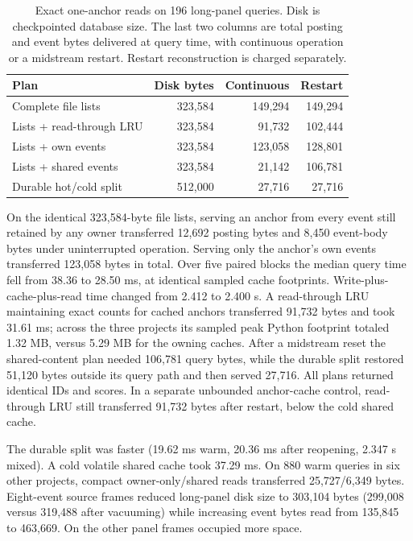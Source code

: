 \documentclass[conference]{IEEEtran}
\begin{document}
\begin{table}[t]
\caption{Exact one-anchor reads on 196 long-panel queries. Disk is checkpointed database size. The last two columns are total posting and event bytes delivered at query time, with continuous operation or a midstream restart. Restart reconstruction is charged separately.}
\label{tab:storage}\centering\small
\setlength{\tabcolsep}{4pt}
\begin{tabular}{@{}lrrr@{}}\toprule
Plan & Disk bytes & Continuous & Restart \\\midrule
Complete file lists & 323,584 & 149,294 & 149,294\\
Lists + read-through LRU & 323,584 & 91,732 & 102,444\\
Lists + own events & 323,584 & 123,058 & 128,801\\
Lists + shared events & 323,584 & 21,142 & 106,781\\
Durable hot/cold split & 512,000 & 27,716 & 27,716\\\bottomrule
\end{tabular}
\end{table}

On the identical 323,584-byte file lists, serving an anchor from every event still retained by any owner transferred 12,692 posting bytes and 8,450 event-body bytes under uninterrupted operation. Serving only the anchor's own events transferred 123,058 bytes in total. Over five paired blocks the median query time fell from 38.36 to 28.50 ms, at identical sampled cache footprints. Write-plus-cache-plus-read time changed from 2.412 to 2.400 s. A read-through LRU maintaining exact counts for cached anchors transferred 91,732 bytes and took 31.61 ms; across the three projects its sampled peak Python footprint totaled 1.32 MB, versus 5.29 MB for the owning caches. After a midstream reset the shared-content plan needed 106,781 query bytes, while the durable split restored 51,120 bytes outside its query path and then served 27,716. All plans returned identical IDs and scores. In a separate unbounded anchor-cache control, read-through LRU still transferred 91,732 bytes after restart, below the cold shared cache.

The durable split was faster (19.62 ms warm, 20.36 ms after reopening, 2.347 s mixed). A cold volatile shared cache took 37.29 ms. On 880 warm queries in six other projects, compact owner-only/shared reads transferred 25,727/6,349 bytes. Eight-event source frames reduced long-panel disk size to 303,104 bytes (299,008 versus 319,488 after vacuuming) while increasing event bytes read from 135,845 to 463,669. On the other panel frames occupied more space.
\end{document}
